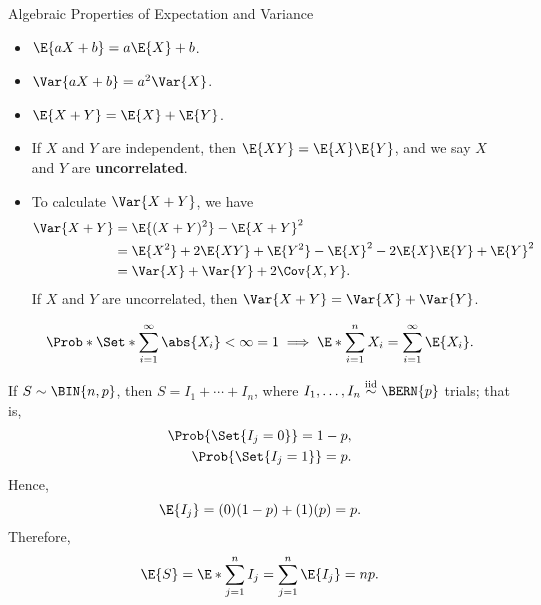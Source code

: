 \begin{Remark}{Algebraic Properties of Expectation and Variance}{}
    \begin{itemize}
        \item $ \E{aX+b}=a\E{X}+b $.
        \item $ \Var{aX+b}=a^2\Var{X} $.
        \item $ \E{X+Y}=\E{X}+\E{Y} $.
        \item If $ X $ and $ Y $ are independent, then
              $ \E{XY}=\E{X}\E{Y} $, and we say $ X $ and $ Y $ are
              \textbf{uncorrelated}.
        \item To calculate $ \Var{X+Y} $, we have
              \begin{align*}
                  \Var{X+Y}
                   & =\E{(X+Y)^2}-\E{X+Y}^2                               \\
                   & =\E{X^2}+2\E{XY}+\E{Y^2}-\E{X}^2-2\E{X}\E{Y}+\E{Y}^2 \\
                   & =\Var{X}+\Var{Y}+2\Cov{X,Y}.
              \end{align*}
              If $ X $ and $ Y $ are uncorrelated, then
              $ \Var{X+Y}=\Var{X}+\Var{Y} $.
    \end{itemize}
\end{Remark}
\begin{Proposition}{}{}
    \[ \Prob*{\Set*{\sum_{i=1}^{\infty}\abs{X_i}<\infty}}=1
        \implies \E*{\sum_{i=1}^{n}X_i}=\sum_{i=1}^{\infty}\E{X_i}. \]
\end{Proposition}
\begin{Example}{}{}
    If $ S\sim\BIN{n,p} $, then $ S=I_1+\cdots+I_n $,
    where $ I_1,\ldots,I_n\iid \BERN{p} $ trials; that is,
    \begin{align*}
        \Prob{\Set{I_j=0}}=1-p, \\
        \Prob{\Set{I_j=1}}=p.
    \end{align*}
    Hence,
    \[ \E{I_j}=(0)(1-p)+(1)(p)=p. \]
    Therefore,
    \[ \E{S}=\E*{\sum_{j=1}^{n}I_j}=\sum_{j=1}^{n}\E{I_j}=np. \]
\end{Example}
